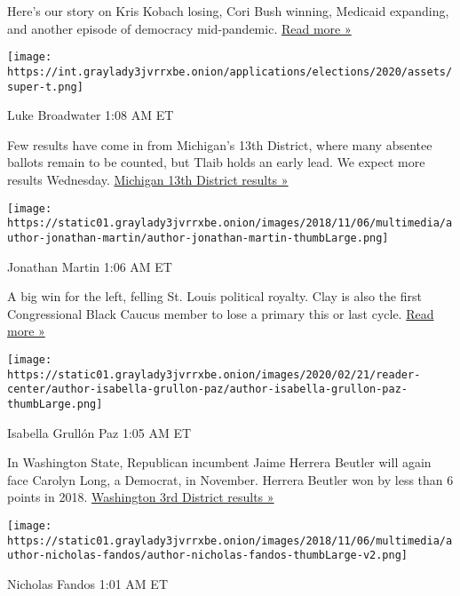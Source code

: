 Here's our story on Kris Kobach losing, Cori Bush winning, Medicaid
expanding, and another episode of democracy mid-pandemic.
\href{https://www.nytimes3xbfgragh.onion/2020/08/04/us/politics/kobach-tlaib.html?action=click\&module=ELEX_results\&pgtype=Interactive\&region=ReporterUpdates}{Read
more »}

\texttt{[image: https://int.graylady3jvrrxbe.onion/applications/elections/2020/assets/super-t.png]}

Luke Broadwater 1:08 AM ET

Few results have come in from Michigan's 13th District, where many
absentee ballots remain to be counted, but Tlaib holds an early lead. We
expect more results Wednesday.
\href{https://www.nytimes3xbfgragh.onion/interactive/2020/08/04/us/elections/results-michigan-house-district-13-primary-election.html?action=click\&module=ELEX_results\&pgtype=Interactive\&region=ReporterUpdates}{Michigan
13th District results »}

\texttt{[image: https://static01.graylady3jvrrxbe.onion/images/2018/11/06/multimedia/author-jonathan-martin/author-jonathan-martin-thumbLarge.png]}

Jonathan Martin 1:06 AM ET

A big win for the left, felling St. Louis political royalty. Clay is
also the first Congressional Black Caucus member to lose a primary this
or last cycle.
\href{https://www.nytimes3xbfgragh.onion/2020/08/05/us/politics/cori-bush-missouri-william-lacy-clay.html?action=click\&module=ELEX_results\&pgtype=Interactive\&region=ReporterUpdates}{Read
more »}

\texttt{[image: https://static01.graylady3jvrrxbe.onion/images/2020/02/21/reader-center/author-isabella-grullon-paz/author-isabella-grullon-paz-thumbLarge.png]}

Isabella Grullón Paz 1:05 AM ET

In Washington State, Republican incumbent Jaime Herrera Beutler will
again face Carolyn Long, a Democrat, in November. Herrera Beutler won by
less than 6 points in 2018.
\href{https://www.nytimes3xbfgragh.onion/interactive/2020/08/04/us/elections/results-washington-house-district-3-primary-election.html?action=click\&module=ELEX_results\&pgtype=Interactive\&region=ReporterUpdates}{Washington
3rd District results »}

\texttt{[image: https://static01.graylady3jvrrxbe.onion/images/2018/11/06/multimedia/author-nicholas-fandos/author-nicholas-fandos-thumbLarge-v2.png]}

Nicholas Fandos 1:01 AM ET

